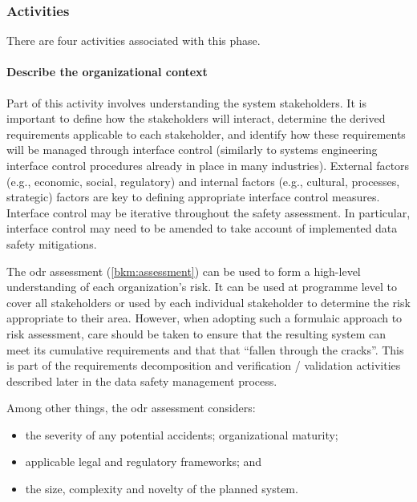 \subsubsection{Activities}
There are four activities associated with this phase.

\paragraph{Describe the organizational context}
Part of this activity involves understanding the system \glspl{stakeholder}. It is important to define how the \glspl{stakeholder} will interact, determine the derived requirements applicable to each \gls{stakeholder}, and identify how these requirements will be managed through interface control (similarly to systems engineering interface control procedures already in place in many industries).  External factors (e.g., economic, social, regulatory) and internal factors (e.g., cultural, processes, strategic) factors are key to defining appropriate interface control measures. Interface control may be iterative throughout the \gls{safety assessment}. In particular, interface control may need to be amended to take account of implemented data safety \glspl{mitigation}.

The \gls{odr} assessment (\autoref{bkm:assessment}) can be used to form a high-level understanding of each organization's risk. It can be used at programme level to cover all \glspl{stakeholder} or used by each individual \gls{stakeholder} to determine the
risk appropriate to their area. However, when adopting such a formulaic approach to risk assessment, care should be taken 
to ensure that the resulting system can meet its cumulative requirements and that that ``fallen through the cracks''. This is part of the requirements decomposition and \gls{verification} / \gls{validation} activities described later in the data safety management process.

Among other things, the \gls{odr} assessment considers:
\begin{itemize}
	\item the severity of any potential accidents; organizational maturity; 
	\item applicable legal and regulatory frameworks; and 
	\item the size, complexity and novelty of the planned system.
\end{itemize}

